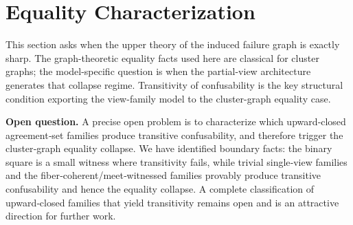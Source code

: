 \section{Equality Characterization}\label{sec:equality}


This section asks when the upper theory of the induced failure graph is exactly sharp. The graph-theoretic equality facts used here are classical for cluster graphs; the model-specific question is when the partial-view architecture generates that collapse regime. Transitivity of confusability is the key structural condition exporting the view-family model to the cluster-graph equality case.

\medskip
\noindent\textbf{Open question.} A precise open problem is to characterize which upward‑closed agreement‑set families produce transitive confusability, and therefore trigger the cluster‑graph equality collapse. We have identified boundary facts: the binary square is a small witness where transitivity fails, while trivial single‑view families and the fiber‑coherent/meet‑witnessed families provably produce transitive confusability and hence the equality collapse. A complete classification of upward‑closed families that yield transitivity remains open and is an attractive direction for further work.

